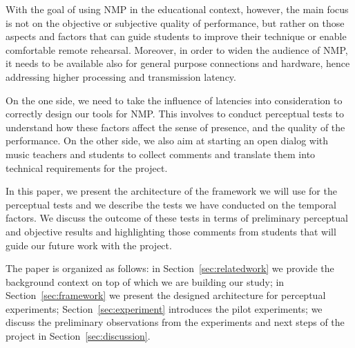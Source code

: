 With the goal of using NMP in the educational context, however, the main focus is not on the objective or subjective quality of performance, but rather on those aspects and factors that can guide students to improve their technique or enable comfortable remote rehearsal. Moreover, in order to widen the audience of NMP, it needs to be available also for general purpose connections and hardware, hence addressing higher processing and transmission latency.  

On the one side, we need to take the influence of latencies into consideration to correctly design our tools for NMP. This involves to conduct perceptual tests to understand how these factors affect the sense of presence, and the quality of the performance. On the other side, we also aim at starting an open dialog with music teachers and students to collect comments and translate them into technical requirements for the project. 

In this paper, we present the architecture of the framework we will use for the perceptual tests and we describe the tests we have conducted on the temporal factors. We discuss the outcome of these tests in terms of preliminary perceptual and objective results and highlighting those comments from students that will guide our future work with the project.

The paper is organized as follows: in Section~\ref{sec:relatedwork} we provide the background context on top of which we are building our study; in Section~\ref{sec:framework} we present the designed architecture for perceptual experiments; Section~\ref{sec:experiment} introduces the pilot experiments; we discuss the preliminary observations from the experiments and next steps of the project in Section~\ref{sec:discussion}.

